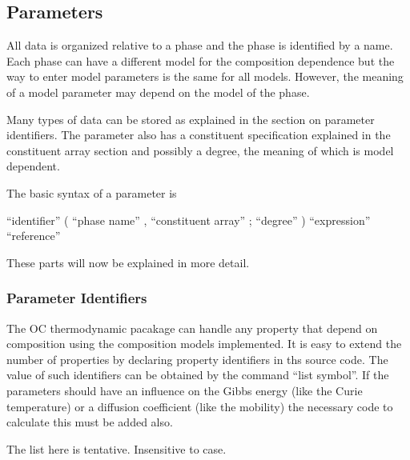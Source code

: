 \documentclass[12pt]{article}
\begin{document}
\subsection{Parameters}

All data is organized relative to a phase and the phase is identified
by a name.  Each phase can have a different model for the composition
dependence but the way to enter model parameters is the same for all
models.  However, the meaning of a model parameter may depend on the
model of the phase.

Many types of data can be stored as explained in the section on
parameter identifiers.  The parameter also has a constituent
specification explained in the constituent array section and possibly
a degree, the meaning of which is model dependent.

The basic syntax of a parameter is

``identifier'' ( ``phase name'' , ``constituent array'' ; ``degree'' ) ``expression'' ``reference''

These parts will now be explained in more detail.

\subsubsection{Parameter Identifiers}

The OC thermodynamic pacakage can handle any property that depend on
composition using the composition models implemented.  It is easy to
extend the number of properties by declaring property identifiers in
ths source code.  The value of such identifiers can be obtained by the
command ``list symbol''.  If the parameters should have an influence
on the Gibbs energy (like the Curie temperature) or a diffusion
coefficient (like the mobility) the necessary code to calculate this
must be added also.

The list here is tentative.  Insensitive to case.
\end{document}
